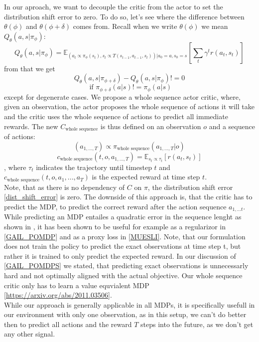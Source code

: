 In our aproach, we want to decouple the critic from the actor to set the distribution shift error to zero. To do so, let's see where the difference between 
$\theta(\phi)$ and $\theta(\phi + \delta)$ comes from. Recall when we write $\theta(\phi)$ we mean $Q_{\theta}(a,s|\pi_{\phi})$:
\begin{equation*}
    Q_{\theta}(a,s|\pi_{\phi}) = \mathbb{E}_{(a_t \propto \pi_{\phi}(s_t), s_t \propto T(s_{t-1}, a_{t-1}, s_t))|a_0=a, s_0=s}\left[\sum_t \gamma^t r(a_t, s_t)\right]
\end{equation*}
from that we get
\begin{equation}
    Q_{\theta }(a,s|\pi_{\phi + \delta}) - Q_{\theta}(a,s|\pi_{\phi}) != 0 
\end{equation}
\begin{equation*}
    \text{ if } \pi_{\phi + \delta}(a|s) != \pi_{\phi}(a|s)
\end{equation*}
except for degenerate cases. We propose a whole sequence actor critic, where, given an observation, the actor proposes the whole sequence of actions it will 
take and the critic uses the whole sequence of actions to predict all immediate rewards. The new $C_{\text{whole sequence}}$ is thus defined on an observation $o$ and a 
sequence of actions: 
\begin{equation}
    (a_{1,...,T}) \propto \pi_{\text{whole sequence}}(a_{1,...,T}|o)
\end{equation}
\begin{equation*}
    c_{\text{whole sequence}}(t, o, a_{1,...,T}) = \mathbb{E}_{s_t \propto \tau_t}\left[r(a_t, s_t)\right]
\end{equation*}
, where $\tau_t$ indicates the trajectory until timestep $t$ and $c_{\text{whole sequence}}(t, o, a_1, ..., a_T)$ is the expected reward at time step $t$. \\
Note, that as there is no dependency of $C$ on $\pi$, the distribution shift error \ref{dist_shift_error} is zero. The downside of this approach is, that the 
critic has to predict the MDP, to predict the correct reward after the action sequence $a_{1, ... t}$. While predicting an MDP entailes a quadratic error in 
the sequence lenght as shown in \cite{NEURIPS2020_b5c01503}, it has been shown to be useful for example as a regularizor in \ref{GAIL_POMDP} and as a proxy 
loss in \ref{MUESLI}. Note, that our formulation does not train the policy to predict the exact observations at time step t, but rather it is trained to 
only predict the expected reward. 
In our discussion of \ref{GAIL_POMDPS} we stated, that predicting exact observations is unnecessarly hard and not optimally aligned with the actual objective. 
Our whole sequence critic only has to learn a value equvialent MDP \ref{https://arxiv.org/abs/2011.03506}.\\
While our approach is generally applicable in all MDPs, it is specifically usefull in our environment with only one observation, as in this setup, we can't do 
better then to predict all actions and the reward $T$ steps into the future, as we don't get any other signal.\\ \\

